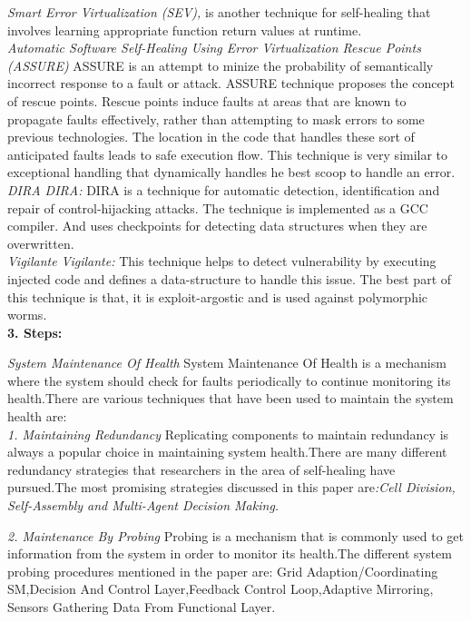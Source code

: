 \textit{Smart Error Virtualization (SEV),} is another technique for self-healing that involves learning appropriate function return values at runtime.\\

\textit{Automatic Software Self-Healing Using Error Virtualization Rescue Points (ASSURE)}
ASSURE is an attempt to minize the probability of semantically incorrect response to a fault or attack. ASSURE technique proposes the concept of rescue points. Rescue points induce faults at areas that are known to propagate faults effectively, rather than attempting to mask errors to some previous technologies. The location in the code that handles these sort of anticipated faults leads to safe execution flow. This technique is very similar to exceptional handling that dynamically handles he best scoop to handle an error.\\

\textit{DIRA DIRA:}
DIRA is a technique for automatic detection, identification and repair of control-hijacking attacks. The technique is implemented as a GCC compiler. And uses checkpoints for detecting data structures when they are overwritten.\\

\textit{Vigilante Vigilante:}
This technique helps to detect vulnerability by executing injected code and defines a data-structure to handle this issue. The best part of this technique is that, it is exploit-argostic and is used against polymorphic worms.\\

\textbf{3. Steps:\\}


\textit{System Maintenance Of Health}
System Maintenance Of Health is a mechanism where the system should check for faults periodically to continue monitoring its health.There are various techniques that have been used to maintain the system health are:\\

\textit{1. Maintaining Redundancy}
Replicating components to maintain redundancy is
always a popular choice in maintaining system health.There are many different redundancy strategies
that researchers in the area of self-healing have pursued.The most promising strategies discussed in this paper are\textit{:Cell Division, Self-Assembly and Multi-Agent Decision Making.}

\textit{2. Maintenance By Probing}
Probing is a mechanism that is commonly used to get
information from the system in order to monitor its health.The different system probing procedures mentioned in the paper are: Grid Adaption/Coordinating SM,Decision And Control Layer,Feedback Control Loop,Adaptive Mirroring, Sensors Gathering Data From Functional Layer.\\

